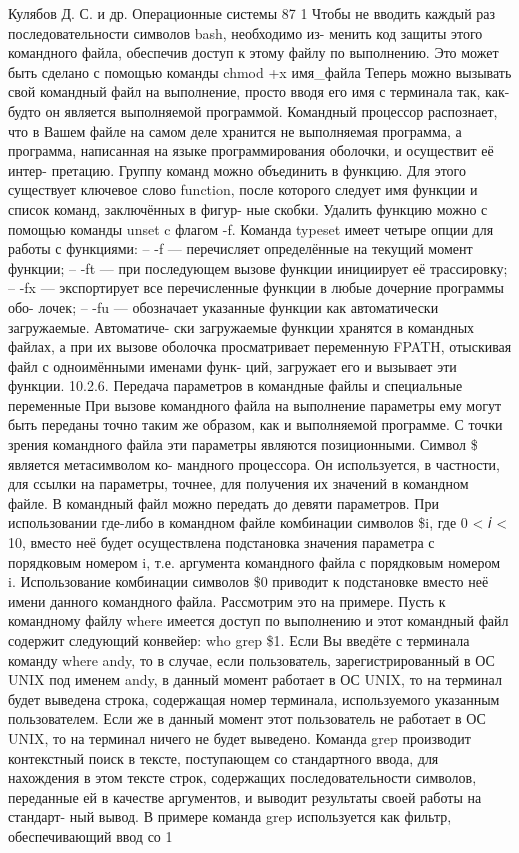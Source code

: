 \documentclass[
  letterpaper,
  DIV=11,
  numbers=noendperiod]{scrartcl}
\begin{document}
Кулябов Д. С. и др. Операционные системы 87 1 Чтобы не вводить каждый
раз последовательности символов bash, необходимо из- менить код защиты
этого командного файла, обеспечив доступ к этому файлу по выполнению.
Это может быть сделано с помощью команды chmod +x имя\_файла Теперь
можно вызывать свой командный файл на выполнение, просто вводя его имя с
терминала так, как-будто он является выполняемой программой. Командный
процессор распознает, что в Вашем файле на самом деле хранится не
выполняемая программа, а программа, написанная на языке программирования
оболочки, и осуществит её интер- претацию. Группу команд можно
объединить в функцию. Для этого существует ключевое слово function,
после которого следует имя функции и список команд, заключённых в фигур-
ные скобки. Удалить функцию можно с помощью команды unset c флагом -f.
Команда typeset имеет четыре опции для работы с функциями: -- -f ---
перечисляет определённые на текущий момент функции; -- -ft --- при
последующем вызове функции инициирует её трассировку; -- -fx ---
экспортирует все перечисленные функции в любые дочерние программы обо-
лочек; -- -fu --- обозначает указанные функции как автоматически
загружаемые. Автоматиче- ски загружаемые функции хранятся в командных
файлах, а при их вызове оболочка просматривает переменную FPATH,
отыскивая файл с одноимёнными именами функ- ций, загружает его и
вызывает эти функции. 10.2.6. Передача параметров в командные файлы и
специальные переменные При вызове командного файла на выполнение
параметры ему могут быть переданы точно таким же образом, как и
выполняемой программе. С точки зрения командного файла эти параметры
являются позиционными. Символ \$ является метасимволом ко- мандного
процессора. Он используется, в частности, для ссылки на параметры,
точнее, для получения их значений в командном файле. В командный файл
можно передать до девяти параметров. При использовании где-либо в
командном файле комбинации символов \$i, где 0 \textless{} 𝑖 \textless{}
10, вместо неё будет осуществлена подстановка значения параметра с
порядковым номером i, т.е. аргумента командного файла с порядковым
номером i. Использование комбинации символов \$0 приводит к подстановке
вместо неё имени данного командного файла. Рассмотрим это на примере.
Пусть к командному файлу where имеется доступ по выполнению и этот
командный файл содержит следующий конвейер: who \textbar{} grep \$1.
Если Вы введёте с терминала команду where andy, то в случае, если
пользователь, зарегистрированный в ОС UNIX под именем andy, в данный
момент работает в ОС UNIX, то на терминал будет выведена строка,
содержащая номер терминала, используемого указанным пользователем. Если
же в данный момент этот пользователь не работает в ОС UNIX, то на
терминал ничего не будет выведено. Команда grep производит контекстный
поиск в тексте, поступающем со стандартного ввода, для нахождения в этом
тексте строк, содержащих последовательности символов, переданные ей в
качестве аргументов, и выводит результаты своей работы на стандарт- ный
вывод. В примере команда grep используется как фильтр, обеспечивающий
ввод со 1
\end{document}
